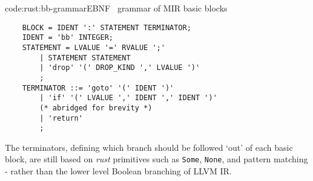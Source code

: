 \begin{codelisting}{code:rust:bb-grammar}{EBNF~\cite{ebnf} grammar of MIR basic blocks}
\begin{spacing}{\codespacing}
\begin{verbatim}
    BLOCK = IDENT ':' STATEMENT TERMINATOR;
    IDENT = 'bb' INTEGER;
    STATEMENT = LVALUE '=' RVALUE ';'
        | STATEMENT STATEMENT
        | 'drop' '(' DROP_KIND ',' LVALUE ')'
        ;
    TERMINATOR ::= 'goto' '(' IDENT ')'
        | 'if' '(' LVALUE ',' IDENT ',' IDENT ')'
        (* abridged for brevity *)
        | 'return'
        ;
\end{verbatim}
\end{spacing}
\end{codelisting}

The terminators, defining which branch should be followed `out' of each basic block, are still based on \emph{rust} primitives such as \texttt{Some}, \texttt{None}, and pattern matching - rather than the lower level Boolean branching of LLVM IR. \cite{rust_intro_mir}
